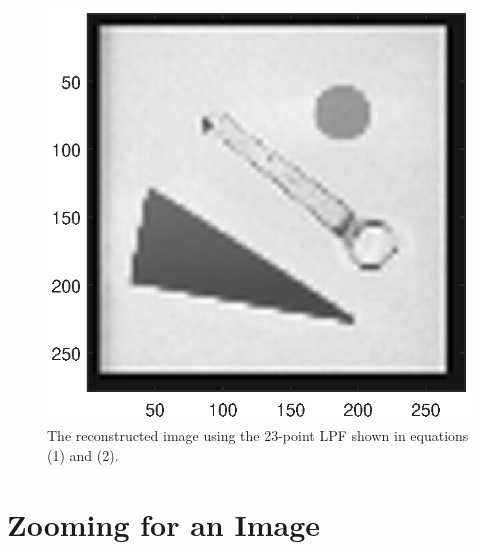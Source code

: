 \documentclass{article}
\begin{document}
\begin{figure}
	\centering
	\includegraphics[scale=0.8]{fig13}
	\caption{The reconstructed image using the 23-point LPF shown in equations (1) and (2).}
\end{figure}

\section{Zooming for an Image}
\end{document}
